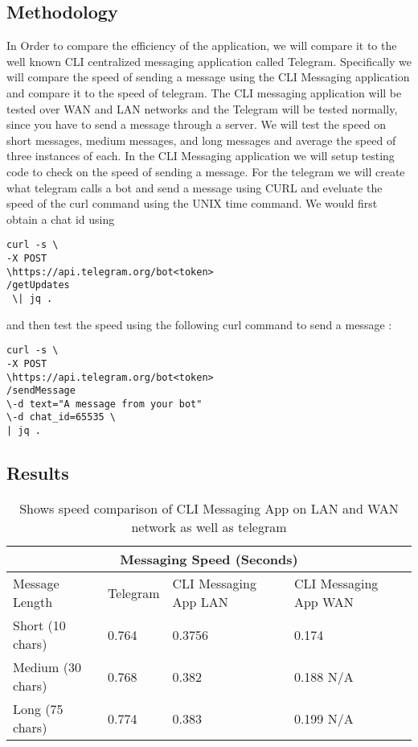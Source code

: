 \documentclass[twoside]{article}
\begin{document}
\begin{multicols}{2}
\subsection{Methodology}
In Order to compare the efficiency of the application, we will compare it to the well known CLI centralized messaging application called Telegram. Specifically we will compare the speed of sending a message using the CLI Messaging application and compare it to the speed of telegram. The CLI messaging application will be tested over WAN and LAN networks and the Telegram will be tested normally, since you have to send a message through a server. We will test the speed on short messages, medium messages, and long messages and average the speed of three instances of each. In the CLI Messaging application we will setup testing code to check on the speed of sending a message. For the telegram we will create what telegram calls a bot and send a message using CURL and eveluate the speed of the curl command using the UNIX time command. We would first obtain a chat id using 
\begin{lstlisting}
curl -s \ 
-X POST 
\https://api.telegram.org/bot<token>
/getUpdates
 \| jq .
\end{lstlisting} 
and then test the speed using the following curl command to send a message \cite{malizia}: 
\begin{lstlisting}
curl -s \
-X POST 
\https://api.telegram.org/bot<token>
/sendMessage 
\-d text="A message from your bot" 
\-d chat_id=65535 \ 
| jq .
\end{lstlisting} 
\centering
\subsection{Results}
\begin{table*}[t]
\centering
\begin{tabular}{ |p{3cm}||p{3cm}|p{3cm}|p{3cm}|  }
 \hline
 \multicolumn{4}{|c|}{Messaging Speed (Seconds)} \\
 \hline
Message Length& Telegram &CLI Messaging App LAN &CLI Messaging App WAN \\
 \hline
 Short (10 chars)   &0.764&0.3756& 0.174\\
 Medium (30 chars)&0.768  &0.382& 0.188 N/A\\
 Long (75 chars) &0.774 & 0.383&0.199  N/A\\
 \hline
\end{tabular}
\caption{ Shows speed comparison of CLI Messaging App on LAN and WAN network as well as telegram}
\end{table*}
\FloatBarrier


\end{multicols}
\end{document}
